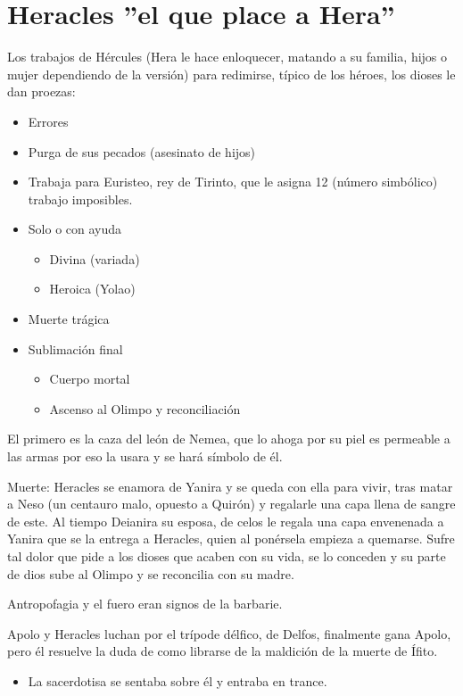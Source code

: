 \section{Heracles ''el que place a Hera''}
Los trabajos de Hércules (Hera le hace enloquecer, matando a su familia, hijos o mujer dependiendo de la versión) para redimirse, típico de los héroes, los dioses le dan proezas:
\begin{itemize}
    \item Errores
    \item Purga de sus pecados (asesinato de hijos)
    \item Trabaja para Euristeo, rey de Tirinto, que le asigna 12 (número simbólico) trabajo imposibles.
    \item Solo o con ayuda
    \begin{itemize}
        \item Divina (variada)
        \item Heroica (Yolao)
    \end{itemize}
    \item Muerte trágica
    \item Sublimación final
    \begin{itemize}
        \item Cuerpo mortal
        \item Ascenso al Olimpo y reconciliación
    \end{itemize}
\end{itemize}
El primero es la caza del león de Nemea, que lo ahoga por su piel es permeable a las armas por eso la usara y se hará símbolo de él.

Muerte: Heracles se enamora de Yanira y se queda con ella para vivir, tras matar a Neso (un centauro malo, opuesto a Quirón) y regalarle una capa llena de sangre de este. Al tiempo Deianira su esposa, de celos le regala una capa envenenada a Yanira que se la entrega a Heracles, quien al ponérsela empieza a quemarse. Sufre tal dolor que pide a los dioses que acaben con su vida, se lo conceden y su parte de dios sube al Olimpo y se reconcilia con su madre.

Antropofagia y el fuero eran signos de la barbarie.

Apolo y Heracles luchan por el trípode délfico, de Delfos, finalmente gana Apolo, pero él resuelve la duda de como librarse de la maldición de la muerte de Ífito.
\begin{itemize}
    \item La sacerdotisa se sentaba sobre él y entraba en trance.
\end{itemize}

